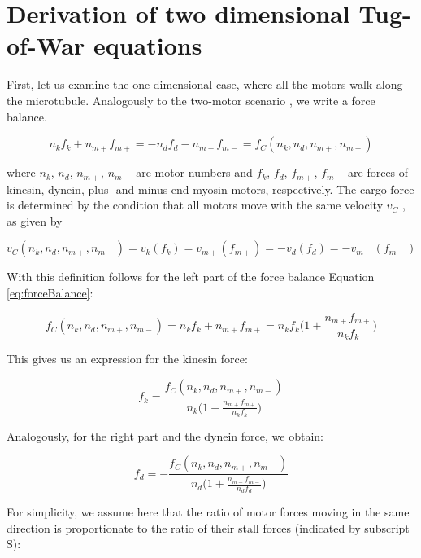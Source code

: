 \section{Derivation of two dimensional Tug-of-War equations}
\label{appendix:2DTugOfWar}

First, let us examine the one-dimensional case, where all the motors walk along the microtubule. Analogously to the two-motor scenario \cite{gennerich2007force, muller2008tug, norstrom2010unconventional}, we write a force balance.

\begin{equation}
n_kf_k + n_{m+}f_{m+} = -n_df_d - n_{m-}f_{m-} = f_C(n_k, n_d, n_{m+}, n_{m-})
\label{eq:forceBalance}
\end{equation}

where $n_k$, $n_d$, $n_{m+}$, $n_{m-}$ are motor numbers and $f_k$, $f_d$, $f_{m+}$, $f_{m-}$ are forces of kinesin, dynein, plus- and minus-end myosin motors, respectively. The cargo force is determined by the condition that all motors move with the same velocity $v_C$ , as given by

\begin{equation}
v_C(n_k, n_d, n_{m+}, n_{m-}) = v_k(f_k) = v_{m+}(f_{m+}) = - v_d(f_d) = - v_{m-}(f_{m-})
\end{equation}

With this definition follows for the left part of the force balance Equation \ref{eq:forceBalance}:

\begin{equation}
f_C(n_k, n_d, n_{m+}, n_{m-}) = n_kf_k + n_{m+}f_{m+} = n_kf_k\big(1 + \frac{n_{m+}f_{m+}}{n_kf_{k}}\big)
\end{equation}

This gives us an expression for the kinesin force:

\begin{equation}
f_k = \frac{f_C(n_k, n_d, n_{m+}, n_{m-})}{n_k\big(1 + \frac{n_{m+}f_{m+}}{n_kf_{k}}\big)}
\end{equation}

Analogously, for the right part and the dynein force, we obtain:

\begin{equation}
f_d = -\frac{f_C(n_k, n_d, n_{m+}, n_{m-})}{n_d\big(1 + \frac{n_{m-}f_{m-}}{n_df_{d}}\big)}
\end{equation}

For simplicity, we assume here that the ratio of motor forces moving in the same direction is proportionate to the ratio of their stall forces (indicated by subscript S):

